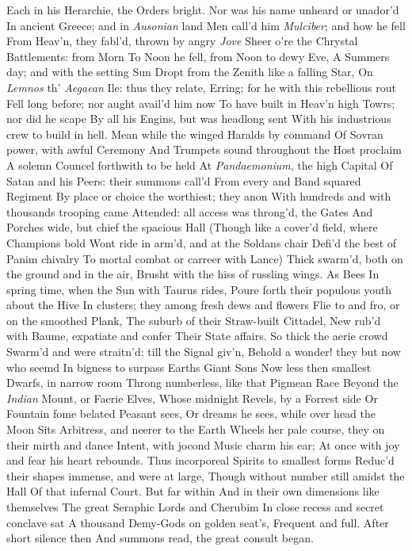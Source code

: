 \documentclass[11pt]{book}
\begin{document}
Each in his Herarchie, the Orders bright. 
Nor was his name unheard or unador'd 
In ancient Greece; and in \textit{Ausonian} land 
Men call'd him \textit{Mulciber}; and how he fell 
From Heav'n, they fabl'd, thrown by angry \textit{Jove} 
Sheer o're the Chrystal Battlements: from Morn 
To Noon he fell, from Noon to dewy Eve, 
A Summers day; and with the setting Sun 
Dropt from the Zenith like a falling Star, 
On \textit{Lemnos} th' \textit{Aegaean} Ile: thus they relate, 
Erring; for he with this rebellious rout 
Fell long before; nor aught avail'd him now 
To have built in Heav'n high Towrs; nor did he scape 
By all his Engins, but was headlong sent 
With his industrious crew to build in hell. 
Mean while the winged Haralds by command 
Of Sovran power, with awful Ceremony 
And Trumpets sound throughout the Host proclaim 
A solemn Councel forthwith to be held 
At \textit{Pandaemonium}, the high Capital 
Of Satan and his Peers: their summons call'd 
From every and Band squared Regiment 
By place or choice the worthiest; they anon 
With hundreds and with thousands trooping came 
Attended: all access was throng'd, the Gates 
And Porches wide, but chief the spacious Hall 
(Though like a cover'd field, where Champions bold 
Wont ride in arm'd, and at the Soldans chair 
Defi'd the best of Panim chivalry 
To mortal combat or carreer with Lance) 
Thick swarm'd, both on the ground and in the air, 
Brusht with the hiss of russling wings.  As Bees 
In spring time, when the Sun with Taurus rides, 
Poure forth their populous youth about the Hive 
In clusters; they among fresh dews and flowers 
Flie to and fro, or on the smoothed Plank, 
The suburb of their Straw-built Cittadel, 
New rub'd with Baume, expatiate and confer 
Their State affairs.  So thick the aerie crowd 
Swarm'd and were straitn'd; till the Signal giv'n, 
Behold a wonder! they but now who seemd 
In bigness to surpass Earths Giant Sons 
Now less then smallest Dwarfs, in narrow room 
Throng numberless, like that Pigmean Race 
Beyond the \textit{Indian} Mount, or Faerie Elves, 
Whose midnight Revels, by a Forrest side 
Or Fountain fome belated Peasant sees, 
Or dreams he sees, while over head the Moon 
Sits Arbitress, and neerer to the Earth 
Wheels her pale course, they on their mirth and dance 
Intent, with jocond Music charm his ear; 
At once with joy and fear his heart rebounds. 
Thus incorporeal Spirits to smallest forms 
Reduc'd their shapes immense, and were at large, 
Though without number still amidst the Hall 
Of that infernal Court.  But far within 
And in their own dimensions like themselves 
The great Seraphic Lords and Cherubim 
In close recess and secret conclave sat 
A thousand Demy-Gods on golden seat's, 
Frequent and full.  After short silence then 
And summons read, the great consult began. 
\end{document}
